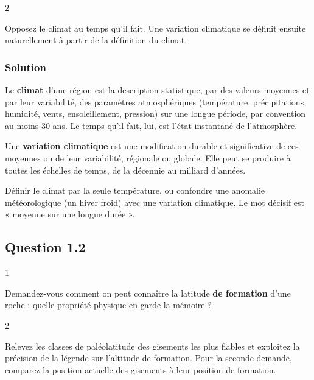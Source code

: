 \documentclass[11pt,a4paper]{article}
\begin{document}
\begin{indication}{2}

Opposez le climat au temps qu'il fait. Une variation climatique se définit ensuite naturellement à partir de la définition du climat.

\end{indication}

\hypertarget{solution}{%
\subsubsection{Solution}\label{solution}}

Le \textbf{climat} d'une région est la description statistique, par des valeurs moyennes et par leur variabilité, des paramètres atmosphériques (température, précipitations, humidité, vents, ensoleillement, pression) sur une longue période, par convention au moins 30 ans. Le temps qu'il fait, lui, est l'état instantané de l'atmosphère.

Une \textbf{variation climatique} est une modification durable et significative de ces moyennes ou de leur variabilité, régionale ou globale. Elle peut se produire à toutes les échelles de temps, de la décennie au milliard d'années.

\begin{piege}

Définir le climat par la seule température, ou confondre une anomalie météorologique (un hiver froid) avec une variation climatique. Le mot décisif est « moyenne sur une longue durée ».

\end{piege}

\hypertarget{question-1.2}{%
\subsection{Question 1.2}\label{question-1.2}}

\begin{indication}{1}

Demandez-vous comment on peut connaître la latitude \textbf{de formation} d'une roche : quelle propriété physique en garde la mémoire ?

\end{indication}

\begin{indication}{2}

Relevez les classes de paléolatitude des gisements les plus fiables et exploitez la précision de la légende sur l'altitude de formation. Pour la seconde demande, comparez la position actuelle des gisements à leur position de formation.

\end{indication}
\end{document}
